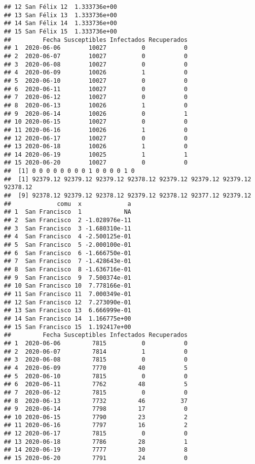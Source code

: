 \documentclass[
]{article}
\begin{document}
\begin{verbatim}
## 12 San Félix 12  1.333736e+00
## 13 San Félix 13  1.333736e+00
## 14 San Félix 14  1.333736e+00
## 15 San Félix 15  1.333736e+00
##         Fecha Susceptibles Infectados Recuperados
## 1  2020-06-06        10027          0           0
## 2  2020-06-07        10027          0           0
## 3  2020-06-08        10027          0           0
## 4  2020-06-09        10026          1           0
## 5  2020-06-10        10027          0           0
## 6  2020-06-11        10027          0           0
## 7  2020-06-12        10027          0           0
## 8  2020-06-13        10026          1           0
## 9  2020-06-14        10026          0           1
## 10 2020-06-15        10027          0           0
## 11 2020-06-16        10026          1           0
## 12 2020-06-17        10027          0           0
## 13 2020-06-18        10026          1           0
## 14 2020-06-19        10025          1           1
## 15 2020-06-20        10027          0           0
##  [1] 0 0 0 0 0 0 0 0 1 0 0 0 0 1 0
##  [1] 92379.12 92379.12 92379.12 92378.12 92379.12 92379.12 92379.12 92378.12
##  [9] 92378.12 92379.12 92378.12 92379.12 92378.12 92377.12 92379.12
##             comu  x             a
## 1  San Francisco  1            NA
## 2  San Francisco  2 -1.028976e-11
## 3  San Francisco  3 -1.680310e-11
## 4  San Francisco  4 -2.500125e-01
## 5  San Francisco  5 -2.000100e-01
## 6  San Francisco  6 -1.666750e-01
## 7  San Francisco  7 -1.428643e-01
## 8  San Francisco  8 -1.636716e-01
## 9  San Francisco  9  7.500374e-01
## 10 San Francisco 10  7.778166e-01
## 11 San Francisco 11  7.000349e-01
## 12 San Francisco 12  7.273090e-01
## 13 San Francisco 13  6.666999e-01
## 14 San Francisco 14  1.166775e+00
## 15 San Francisco 15  1.192417e+00
##         Fecha Susceptibles Infectados Recuperados
## 1  2020-06-06         7815          0           0
## 2  2020-06-07         7814          1           0
## 3  2020-06-08         7815          0           0
## 4  2020-06-09         7770         40           5
## 5  2020-06-10         7815          0           0
## 6  2020-06-11         7762         48           5
## 7  2020-06-12         7815          0           0
## 8  2020-06-13         7732         46          37
## 9  2020-06-14         7798         17           0
## 10 2020-06-15         7790         23           2
## 11 2020-06-16         7797         16           2
## 12 2020-06-17         7815          0           0
## 13 2020-06-18         7786         28           1
## 14 2020-06-19         7777         30           8
## 15 2020-06-20         7791         24           0

\end{verbatim}
\end{document}
